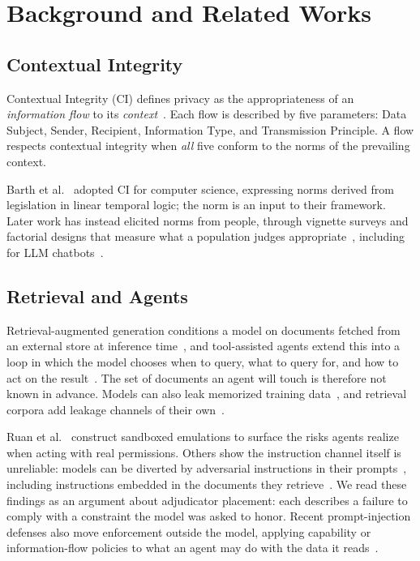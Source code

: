 \section{Background and Related Works}
\label{sec:background}
\subsection{Contextual Integrity}

Contextual Integrity (CI) defines privacy as the appropriateness of an
\textit{information flow} to its \textit{context}~\cite{nissenbaum}. Each flow
is described by five parameters: Data Subject, Sender, Recipient, Information
Type, and Transmission Principle. A flow respects contextual integrity when
\textit{all} five conform to the norms of the prevailing context.

Barth et al.~\cite{barth2006} adopted CI for computer science, expressing norms
derived from legislation in linear temporal logic; the norm is an input to
their framework. Later work has instead elicited norms from people, through
vignette surveys and factorial designs that measure what a population judges
appropriate~\cite{martin2016,apthorpe2018}, including for LLM
chatbots~\cite{tran2025}.

\subsection{Retrieval and Agents}
Retrieval-augmented generation conditions a model on documents fetched from an
external store at inference time~\cite{lewis2020}, and tool-assisted agents
extend this into a loop in which the model chooses when to query, what to query
for, and how to act on the result~\cite{yao2023,schick2023}. The set of
documents an agent will touch is therefore not known in advance. Models can
also leak memorized training data~\cite{carlini2021}, and retrieval corpora add
leakage channels of their own~\cite{zeng2024}.

Ruan et al.~\cite{ruan2024} construct sandboxed emulations to surface the risks
agents realize when acting with real permissions. Others show the instruction
channel itself is unreliable: models can be diverted by adversarial
instructions in their prompts~\cite{perez2022}, including instructions embedded
in the documents they retrieve~\cite{greshake2023}. We read these findings as
an argument about adjudicator placement: each describes a failure to comply
with a constraint the model was asked to honor. Recent prompt-injection
defenses also move enforcement outside the model, applying capability or
information-flow policies to what an agent may do with the data it
reads~\cite{debenedetti2026camel,costa2025fides}.

